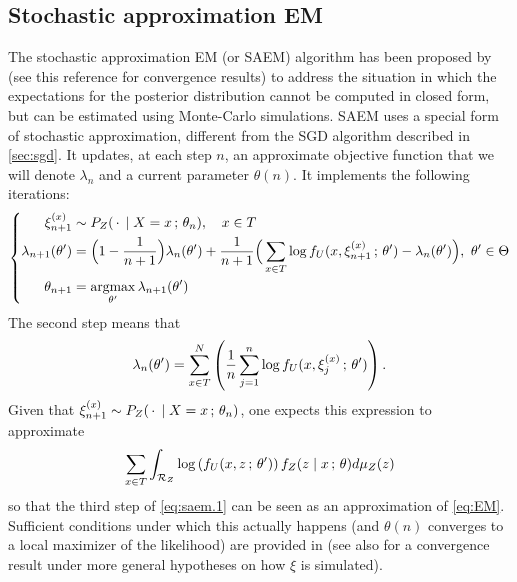 \subsection{Stochastic approximation EM}
\label{sec:saem}
The stochastic approximation EM (or SAEM) algorithm has been proposed by \citet{delyon1999convergence} (see this reference for convergence results) to address the situation in which the expectations for the posterior distribution cannot be computed in closed form, but can be estimated using Monte-Carlo simulations.  SAEM uses a special form of stochastic approximation, different from the SGD algorithm described in \cref{sec:sgd}. It updates, at each step $n$, an approximate objective function that we will denote $\lambda_n$ and a current parameter $\theta(n)$.  It implements the following iterations:
\begin{equation}
\left\{
\begin{aligned}
\xi^{(x)}_{n+1} & \sim P_Z(\,\cdot\,\mid X=x\,;\,\theta_n),\quad  x\in T\\
\lambda_{n+1}(\theta') &= \Big(1-\frac1{n+1}\Big)\lambda_n(\theta') + \frac1{n+1}\Big( \sum_{x\in T} \log f_U(x, \xi^{(x)}_{n+1}\,;\,\theta') - \lambda_n(\theta')\Big),\  \theta'\in \Theta\\
\theta_{n+1} &= \operatorname*{argmax}_{\theta'}  \lambda_{n+1}(\theta')
\end{aligned}
\right.
\label{eq:saem.1}
\end{equation}
The second step means that 
\[
\lambda_{n}(\theta') = \sum_{x\in T}^N \left(\frac{1}{n} \sum_{j=1}^n \log f_U(x, \xi^{(x)}_j\,;\,\theta')\right).
\]
Given that $\xi^{(x)}_{n+1} \sim P_Z(\,\cdot\,\mid X=x\,;\,\theta_n)$, one expects this expression to approximate
\[
\sum_{x\in T} \int_{{\mathcal R}_Z} \log \left(f_U(x,
z\,;\,\theta')\right) f_Z(z\mid x\,;\,\theta) d\mu_Z(z)
\]
so that the third step of \cref{eq:saem.1} can be seen as an approximation of \cref{eq:EM}. Sufficient conditions under which this actually happens (and $\theta(n)$ converges to a local maximizer of the likelihood) are provided in \citet{delyon1999convergence} (see also \citet{kuhn2004coupling} for a convergence result under more general hypotheses on how $\xi$ is simulated).


